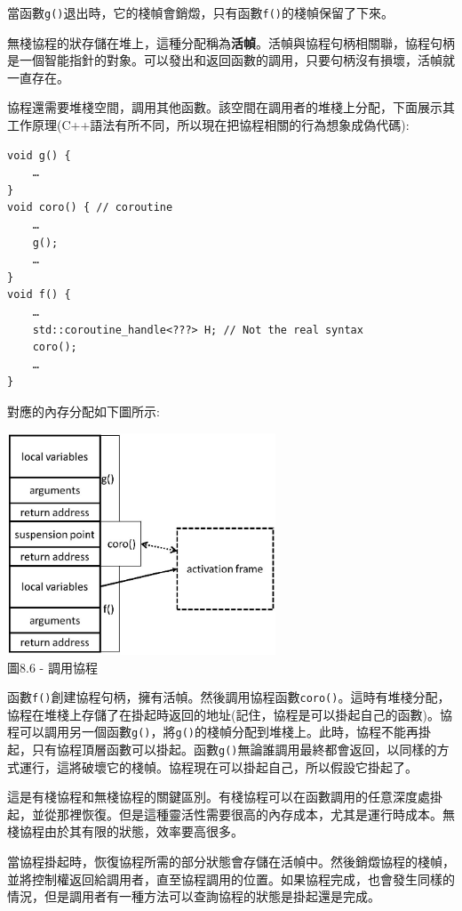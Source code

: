 當函數\texttt{g()}退出時，它的棧幀會銷燬，只有函數\texttt{f()}的棧幀保留了下來。

無棧協程的狀存儲在堆上，這種分配稱為\textbf{活幀}。活幀與協程句柄相關聯，協程句柄是一個智能指針的對象。可以發出和返回函數的調用，只要句柄沒有損壞，活幀就一直存在。

協程還需要堆棧空間，調用其他函數。該空間在調用者的堆棧上分配，下面展示其工作原理(C++語法有所不同，所以現在把協程相關的行為想象成偽代碼):

\begin{lstlisting}[style=styleCXX]
void g() {
	…
}
void coro() { // coroutine
	…
	g();
	…
}
void f() {
	…
	std::coroutine_handle<???> H; // Not the real syntax
	coro();
	…
}
\end{lstlisting}

對應的內存分配如下圖所示:

\begin{center}
\includegraphics[width=0.6\textwidth]{content/2/chapter8/images/6.jpg}\\
圖8.6 - 調用協程
\end{center}

函數\texttt{f()}創建協程句柄，擁有活幀。然後調用協程函數\texttt{coro()}。這時有堆棧分配，協程在堆棧上存儲了在掛起時返回的地址(記住，協程是可以掛起自己的函數)。協程可以調用另一個函數\texttt{g()}，將\texttt{g()}的棧幀分配到堆棧上。此時，協程不能再掛起，只有協程頂層函數可以掛起。函數\texttt{g()}無論誰調用最終都會返回，以同樣的方式運行，這將破壞它的棧幀。協程現在可以掛起自己，所以假設它掛起了。 

這是有棧協程和無棧協程的關鍵區別。有棧協程可以在函數調用的任意深度處掛起，並從那裡恢復。但是這種靈活性需要很高的內存成本，尤其是運行時成本。無棧協程由於其有限的狀態，效率要高很多。

當協程掛起時，恢復協程所需的部分狀態會存儲在活幀中。然後銷燬協程的棧幀，並將控制權返回給調用者，直至協程調用的位置。如果協程完成，也會發生同樣的情況，但是調用者有一種方法可以查詢協程的狀態是掛起還是完成。

